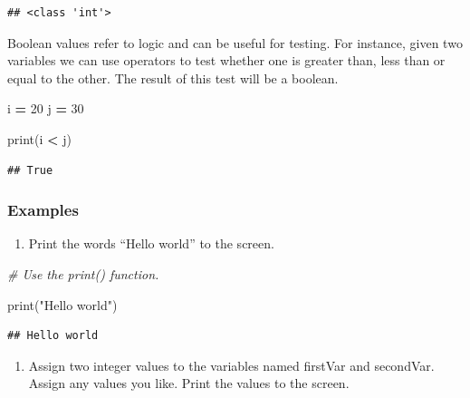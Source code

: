 \documentclass[
]{book}
\newenvironment{Shaded}{\begin{snugshade}}{\end{snugshade}}
\newcommand{\BuiltInTok}[1]{#1}
\newcommand{\CommentTok}[1]{\textcolor[rgb]{0.56,0.35,0.01}{\textit{#1}}}
\newcommand{\DecValTok}[1]{\textcolor[rgb]{0.00,0.00,0.81}{#1}}
\newcommand{\NormalTok}[1]{#1}
\newcommand{\OperatorTok}[1]{\textcolor[rgb]{0.81,0.36,0.00}{\textbf{#1}}}
\newcommand{\StringTok}[1]{\textcolor[rgb]{0.31,0.60,0.02}{#1}}
\providecommand{\tightlist}{%
  \setlength{\itemsep}{0pt}\setlength{\parskip}{0pt}}
\begin{document}
\begin{verbatim}
## <class 'int'>
\end{verbatim}

Boolean values refer to logic and can be useful for testing. For instance, given two variables we can use operators to test whether one is greater than, less than or equal to the other. The result of this test will be a boolean.

\begin{Shaded}
\begin{Highlighting}[]
\NormalTok{i }\OperatorTok{=} \DecValTok{20}
\NormalTok{j }\OperatorTok{=} \DecValTok{30}

\BuiltInTok{print}\NormalTok{(i }\OperatorTok{\textless{}}\NormalTok{ j)}
\end{Highlighting}
\end{Shaded}

\begin{verbatim}
## True
\end{verbatim}

\hypertarget{examples}{%
\subsubsection{Examples}\label{examples}}

\begin{enumerate}
\def\labelenumi{\arabic{enumi}.}
\tightlist
\item
  Print the words ``Hello world'' to the screen.
\end{enumerate}

\begin{Shaded}
\begin{Highlighting}[]
\CommentTok{\# Use the print() function.}

\BuiltInTok{print}\NormalTok{(}\StringTok{"Hello world"}\NormalTok{)}
\end{Highlighting}
\end{Shaded}

\begin{verbatim}
## Hello world
\end{verbatim}

\begin{enumerate}
\def\labelenumi{\arabic{enumi}.}
\setcounter{enumi}{1}
\tightlist
\item
  Assign two integer values to the variables named firstVar and secondVar. Assign any values you like. Print the values to the screen.
\end{enumerate}
\end{document}
